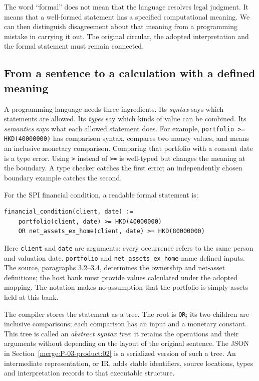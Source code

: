 The word ``formal'' does not mean that the language resolves legal judgment.
It means that a well-formed statement has a specified computational meaning.
We can then distinguish disagreement about that meaning from a programming
mistake in carrying it out. The original circular, the adopted interpretation
and the formal statement must remain connected.

\subsection{From a sentence to a calculation with a defined meaning}
\label{merge:P-01a-language-lesson:01}


A programming language needs three ingredients. Its \emph{syntax} says which
statements are allowed. Its \emph{types} say which kinds of value can be combined.
Its \emph{semantics} says what each allowed statement does. For example,
\texttt{portfolio >= HKD(40000000)} has comparison syntax, compares two money
values, and means an inclusive monetary comparison. Comparing that portfolio
with a consent date is a type error. Using \texttt{>} instead of \texttt{>=} is
well-typed but changes the meaning at the boundary. A type checker catches the
first error; an independently chosen boundary example catches the second.

For the SPI financial condition, a readable formal statement is:
\begin{lstlisting}[caption={Illustrative controlled syntax for Annex 1 paragraph 3.1. This is a teaching notation, not Catala or Stipula source.}]
financial_condition(client, date) :=
    portfolio(client, date) >= HKD(40000000)
    OR net_assets_ex_home(client, date) >= HKD(80000000)
\end{lstlisting}
Here \texttt{client} and \texttt{date} are arguments: every occurrence refers to
the same person and valuation date. \texttt{portfolio} and
\texttt{net\_assets\_ex\_home} name defined inputs. The source, paragraphs
3.2--3.4, determines the ownership and net-asset definitions; the host bank must
provide values calculated under the adopted mapping. The notation makes no
assumption that the portfolio is simply assets held at this bank.


The compiler stores the statement as a tree. The root is \texttt{OR}; its two
children are inclusive comparisons; each comparison has an input and a monetary
constant. This tree is called an \emph{abstract syntax tree}: it retains the
operations and their arguments without depending on the layout of the original
sentence. The JSON in Section~\ref{merge:P-03-product:02} is a serialized version of such
a tree. An intermediate representation, or IR, adds stable identifiers, source
locations, types and interpretation records to that executable structure.

